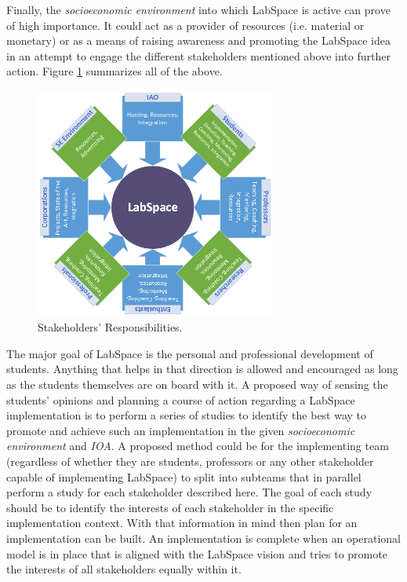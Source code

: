 \documentclass[a4paper, 11pt]{article}
\begin{document}
Finally, the \textit{socioeconomic environment} into which LabSpace is active can prove of high importance. It could act as a provider of resources (i.e. material or monetary) or as a means of raising awareness and promoting the LabSpace idea in an attempt to engage the different stakeholders mentioned above into further action. Figure \ref{fig:ls_responsibilities} summarizes all of the above.

\begin{figure}[h!]
  \begin{center}
    \includegraphics[width=300px,height=\textheight,keepaspectratio]{imagery/ls_stakeholders.png}
    \caption{Stakeholders' Responsibilities.}
    \label{fig:ls_responsibilities}
  \end{center}
\end{figure}

The major goal of LabSpace is the personal and professional development of students. Anything that helps in that direction is allowed and encouraged as long as the students themselves are on board with it. A proposed way of sensing the students' opinions and planning a course of action regarding a LabSpace implementation is to perform a series of studies to identify the best way to promote and achieve such an implementation in the given \textit{socioeconomic environment} and \textit{IOA}. A proposed method could be for the implementing team (regardless of whether they are students, professors or any other stakeholder capable of implementing LabSpace) to split into subteams that in parallel perform a study for each stakeholder described here. The goal of each study should be to identify the interests of each stakeholder in the specific implementation context. With that information in mind then plan for an implementation can be built. An implementation is complete when an operational model is in place that is aligned with the LabSpace vision and tries to promote the interests of all stakeholders equally within it.
\end{document}
